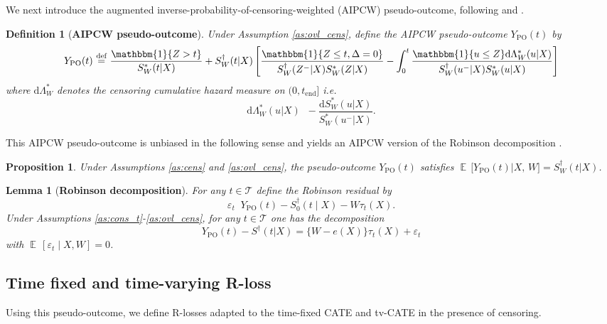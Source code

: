 \documentclass{article}
\newtheorem{proposition}[theorem]{Proposition}
\newtheorem{lemma}[theorem]{Lemma}
\newtheorem{definition}{Definition}
\DeclareMathOperator*{\eqdef }{\,\stackrel{\text{def}}{=}\,}
\DeclareMathOperator{\IDF}{\mathbbm{1}}%
\DeclareMathOperator{\EX}{\mathbb{E}\,}
\newcommand{\tend}{t_{\mathrm{end}}}
\newcommand{\nd}{\mathrm{d}}
\begin{document}
We next introduce the augmented inverse-probability-of-censoring-weighted (AIPCW) pseudo-outcome, following \citet{rubin2006doubly} and \citet{cui2023estimating}.
\begin{definition}[{\bf AIPCW pseudo-outcome}]
Under Assumption \ref{as:ovl_cens}, define the \emph{AIPCW pseudo-outcome} $Y_{\mathrm{PO}}(t)$ by
\begin{align*}
Y_{\mathrm{PO}}(t) \eqdef \frac{\IDF\{Z > t\}}{S^*_W(t | X)} + S^\dagger_W(t | X)
\left[ \frac{\IDF\{Z \le t, \Delta=0\}  }{S^\dagger_W(Z^- | X) S^*_W(Z| X)}
-  \int_{0}^{t} \frac{\IDF\{u \leq Z\}  \nd\Lambda^*_W(u| X)}{S^\dagger_W(u^-| X) S^*_W(u| X)} \right] 
\end{align*}
where $\nd\Lambda^*_W$ denotes the censoring cumulative hazard measure on $(0,\tend]$ i.e.
\[ \nd\Lambda_W^*(u|X) \eqdef -\frac{\nd S_W^*(u|X)}{S_W^*(u^-|X)}.\]
\end{definition}
This AIPCW pseudo-outcome is unbiased in the following sense and yields an AIPCW version of the Robinson decomposition \citep{robinson1988root}.
\begin{proposition}\label{prop:unbiasedness}
Under Assumptions \ref{as:cens} and \ref{as:ovl_cens}, the pseudo-outcome $Y_{\mathrm{PO}}(t)$ satisfies $\EX\bigl[Y_{\mathrm{PO}}(t) | X,\, W\bigr] = S^\dagger_W(t | X)$.
\end{proposition}
\begin{lemma}[{\bf Robinson decomposition}]\label{lemma:robinson_dec}
For any $t \in \mathcal{T}$ define the Robinson residual by 
\[
\varepsilon_t \eqdef  Y_{\mathrm{PO}}(t)- S_0^\dag(t\mid X) - W\tau_t(X).
\]
Under Assumptions \ref{as:cons_t}-\ref{as:ovl_cens}, for any $t \in \mathcal{T}$ one has the decomposition 
\[Y_{\mathrm{PO}}(t) - S^\dag(t|X) = \{W-e(X)\}\tau_t(X) + \varepsilon_t\]
with $\EX [ \varepsilon_t \mid X,W ] = 0$.
\end{lemma}

\subsection{Time fixed and time-varying R-loss}
Using this pseudo-outcome, we define R-losses adapted to the time-fixed CATE and tv-CATE in the presence of censoring.
\end{document}
